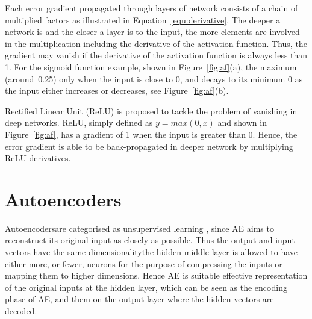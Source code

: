 Each error gradient propagated through layers of \DIFaddbegin {}\DIFaddend network consists of a chain of multiplied factors as illustrated in Equation~\ref{equ:derivative}.
The deeper a network is and the closer a layer is to the input, the more elements are involved in the multiplication including the derivative of the activation function.
Thus, the gradient may vanish if the derivative of the activation function is always less than 1.
For the sigmoid function example, shown in Figure~\ref{fig:af}(a), \DIFdelbegin {}\DIFdelend \DIFaddbegin {}\DIFaddend the maximum (around~0.25) only when the input is close to 0, and decays to its minimum 0 as the input either increases or decreases, see Figure~\ref{fig:af}(b).

\DIFaddbegin {}\DIFaddend Rectified Linear Unit (ReLU) is proposed to tackle the problem of vanishing \DIFdelbegin {}\DIFdelend \DIFaddbegin {}\DIFaddend in deep networks.
ReLU, simply defined as $y = max(0,x)$ and shown in Figure~\ref{fig:af}, has a gradient of 1 when the input is greater than 0.
Hence, the error gradient is able to be back-propagated in deeper network by multiplying ReLU derivatives.

\section{Autoencoders}
\label{sec:AE}
Autoencoders\DIFaddbegin {}\DIFaddend are categorised as unsupervised learning \DIFaddbegin {}\DIFaddend , since AE aims to reconstruct its original input as closely as possible.
Thus the output and input vectors have the same dimensionality\DIFdelbegin {}\DIFdelend \DIFaddbegin {}\DIFaddend the hidden middle layer is allowed to have either more, or fewer, neurons for the purpose of compressing the inputs or mapping them to higher dimensions.
Hence \DIFaddbegin {}\DIFaddend AE is suitable \DIFdelbegin {}\DIFdelend \DIFaddbegin {}\DIFaddend effective representation of the original inputs at the hidden layer, which can be seen as the encoding phase of \DIFaddbegin {}\DIFaddend AE, and \DIFdelbegin {}\DIFdelend \DIFaddbegin {}\DIFaddend them on the output layer where the hidden vectors are decoded. 


